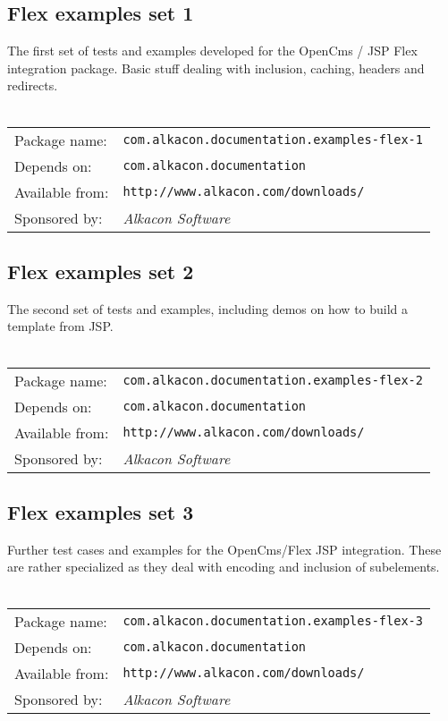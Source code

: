 \subsection{Flex examples set 1}
The first set of tests and examples developed for the OpenCms / JSP Flex integration package. 
Basic stuff dealing with inclusion, caching, headers and redirects.
\\
\\
\begin{tabular}{ll}
Package name: & {\tt com.alkacon.documentation.examples-flex-1}\\
Depends on: & {\tt com.alkacon.documentation}\\
Available from: & {\tt http://www.alkacon.com/downloads/}\\
Sponsored by: & {\em Alkacon Software}\\
\end{tabular}

\subsection{Flex examples set 2}
The second set of tests and examples, including demos on how to build a template from JSP.
\\
\\
\begin{tabular}{ll}
Package name: & {\tt com.alkacon.documentation.examples-flex-2}\\
Depends on: & {\tt com.alkacon.documentation}\\
Available from: & {\tt http://www.alkacon.com/downloads/}\\
Sponsored by: & {\em Alkacon Software}\\
\end{tabular}

\subsection{Flex examples set 3}
Further test cases and examples for the OpenCms/Flex JSP integration. These are rather 
specialized as they deal with encoding and inclusion of subelements.
\\
\\
\begin{tabular}{ll}
Package name: & {\tt com.alkacon.documentation.examples-flex-3}\\
Depends on: & {\tt com.alkacon.documentation}\\
Available from: & {\tt http://www.alkacon.com/downloads/}\\
Sponsored by: & {\em Alkacon Software}\\
\end{tabular}

